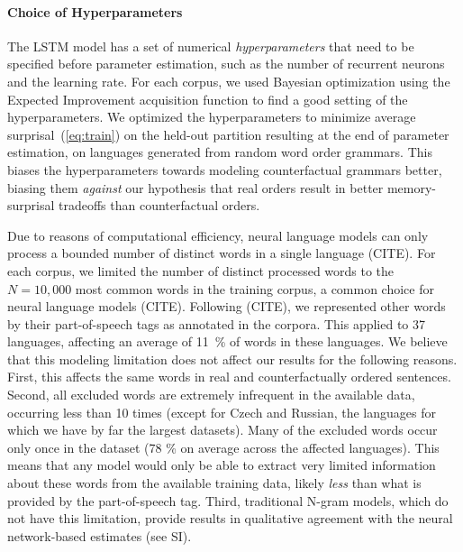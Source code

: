 \paragraph{Choice of Hyperparameters}

The LSTM model has a set of numerical \emph{hyperparameters} that need to be specified before parameter estimation, such as the number of recurrent neurons and the learning rate. %
For each corpus, we used Bayesian optimization using the Expected Improvement acquisition function \citep{snoek-practical-2012} to find a good setting of the hyperparameters.
We optimized the hyperparameters to minimize average surprisal~(\ref{eq:train}) on the held-out partition resulting at the end of parameter estimation, on languages generated from random word order grammars.
This biases the hyperparameters towards modeling counterfactual grammars better, biasing them \emph{against} our hypothesis that real orders result in better memory-surprisal tradeoffs than counterfactual orders.

Due to reasons of computational efficiency, neural language models can only process a bounded number of distinct words in a single language (CITE).
For each corpus, we limited the number of distinct processed words to the $N=10,000$ most common words in the training corpus, a common choice for neural language models (CITE).
Following (CITE), we represented other words by their part-of-speech tags as annotated in the corpora.
This applied to 37 languages, affecting an average of 11~\% of words in these languages.
We believe that this modeling limitation does not affect our results for the following reasons.
First, this affects the same words in real and counterfactually ordered sentences.
Second, all excluded words are extremely infrequent in the available data, occurring less than 10 times (except for Czech and Russian, the languages for which we have by far the largest datasets).
Many of the excluded words occur only once in the dataset (78 \% on average across the affected languages).
This means that any model would only be able to extract very limited information about these words from the available training data, likely \emph{less} than what is provided by the part-of-speech tag.
Third, traditional N-gram models, which do not have this limitation, provide results in qualitative agreement with the neural network-based estimates (see SI).




